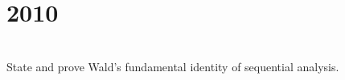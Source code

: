 \section*{2010}
\vspace{-.5cm}
\hrulefill \smallskip\\
 State and prove Wald's fundamental identity of sequential analysis.